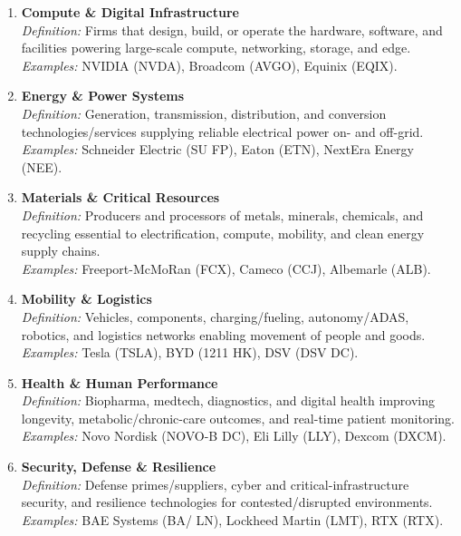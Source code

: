 \documentclass[11pt]{article}
\begin{document}
\begin{enumerate}[leftmargin=*]
\item \textbf{Compute \& Digital Infrastructure}\\
\emph{Definition:} Firms that design, build, or operate the hardware, software, and facilities powering large-scale compute, networking, storage, and edge.\\
\emph{Examples:} NVIDIA (NVDA), Broadcom (AVGO), Equinix (EQIX).

\item \textbf{Energy \& Power Systems}\\
\emph{Definition:} Generation, transmission, distribution, and conversion technologies/services supplying reliable electrical power on- and off-grid.\\
\emph{Examples:} Schneider Electric (SU FP), Eaton (ETN), NextEra Energy (NEE).

\item \textbf{Materials \& Critical Resources}\\
\emph{Definition:} Producers and processors of metals, minerals, chemicals, and recycling essential to electrification, compute, mobility, and clean energy supply chains.\\
\emph{Examples:} Freeport-McMoRan (FCX), Cameco (CCJ), Albemarle (ALB).

\item \textbf{Mobility \& Logistics}\\
\emph{Definition:} Vehicles, components, charging/fueling, autonomy/ADAS, robotics, and logistics networks enabling movement of people and goods.\\
\emph{Examples:} Tesla (TSLA), BYD (1211 HK), DSV (DSV DC).

\item \textbf{Health \& Human Performance}\\
\emph{Definition:} Biopharma, medtech, diagnostics, and digital health improving longevity, metabolic/chronic-care outcomes, and real-time patient monitoring.\\
\emph{Examples:} Novo Nordisk (NOVO-B DC), Eli Lilly (LLY), Dexcom (DXCM).

\item \textbf{Security, Defense \& Resilience}\\
\emph{Definition:} Defense primes/suppliers, cyber and critical-infrastructure security, and resilience technologies for contested/disrupted environments.\\
\emph{Examples:} BAE Systems (BA/ LN), Lockheed Martin (LMT), RTX (RTX).


\end{enumerate}
\end{document}
